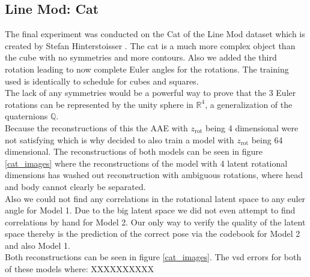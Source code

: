 \documentclass[10pt,a4paper]{article}
\newcommand{\rot}{\ensuremath{\text{rot}\xspace}}
\begin{document}
\newpage
\subsection{Line Mod: Cat}
The final experiment was conducted on the Cat of the Line Mod dataset which is created by Stefan Hinterstoisser \cite{LINEMOD}.
The cat is a much more complex object than the cube with no symmetries and more contours. Also we added the third rotation leading to now complete Euler angles for the rotations. The training used is identically to schedule for cubes and squares. \\
The lack of any symmetries would be a powerful way to prove that the 3 Euler rotations can be represented by the unity sphere in $\mathbb{R}^4$, a generalization of the quaternions $\mathbb{Q}$.\\
Because the reconstructions of this the AAE with $z_{\rot}$ being 4 dimensional were not satisfying which is why decided to also train a model with $z_{\rot}$ being 64 dimensional. The reconstructions of both models can be seen in figure \ref{cat_images} where the reconstructions of the model with 4 latent rotational dimensions has washed out reconstruction with ambiguous rotations, where head and body cannot clearly be separated. \\
Also we could not find any correlations in the rotational latent space to any euler angle for Model 1. Due to the big latent space we did not even attempt to find correlations by hand for Model 2. Our only way to verify the quality of the latent space thereby is the prediction of the correct pose via the codebook for Model 2 and also Model 1. \\




 Both reconstructions can be seen in figure \ref{cat_images}. The vsd errors for both of these models where: XXXXXXXXXX
\end{document}
